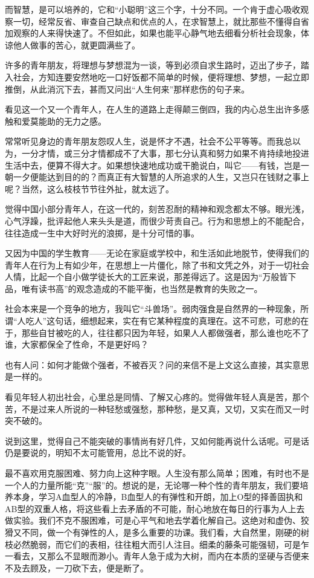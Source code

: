 \par 而智慧，是可以培养的，它和“小聪明”这三个字，十分不同。一个肯于虚心吸收观察一切，经常反省、审查自己缺点和优点的人，在求智慧上，就比那些不懂得自省加观察的人来得快速了。不但如此，如果也能平心静气地去细看分析社会现象，体谅他人做事的苦心，就更圆满些了。
\par 许多的青年朋友，将理想与梦想混为一谈，等到必须自求生路时，迈出了步子，踏入社会，方知连要安然地吃一口好饭都不简单的时候，便将理想、梦想，一起立即推倒，从此消沉下去，甚而又问出“人生何来”那样悲伤的句子来。
\par 看见这一个又一个青年人，在人生的道路上走得颠三倒四，我的内心总生出许多感触和爱莫能助的无力之感。
\par 常常听见身边的青年朋友怨叹人生，说是怀才不遇，社会不公平等等。而我总以为，一分才情，或三分才情都成不了大事，那七分认真和努力如果不肯持续地投进生活中去，便算不得大才。如果想快速地成功或干脆说白，叫它——有钱，岂是一朝一夕便能达到目的的？而真正有大智慧的人所追求的人生，又岂只在钱财之事上呢？当然，这么枝枝节节往外扯，就太远了。
\par 觉得中国小部分青年人，在这一代的，刻苦忍耐的精神和观念都太不够。眼光浅，心气浮躁，批评起他人来头头是道，而很少苛责自己。行为和思想上的不能配合，往往造成一生中大好时光的浪掷，是十分可惜的事。
\par 又因为中国的学生教育——无论在家庭或学校中，和生活如此地脱节，使得我们的青年人在行为上有如少年，在思想上一片僵化，除了书和文凭之外，对于一切社会人情，比起一个自小做学徒长大的工匠来说，那差得远了。这是因为“万般皆下品，唯有读书高”的观念造成的不能平衡，也当然是教育的失败之一。
\par 社会本来是一个竞争的地方，我叫它“斗兽场”。弱肉强食是自然界的一种现象，所谓“人吃人”这句话，细想起来，实在有它某种程度的真理在。这不可悲，可悲的在于，那些自甘被吃的人，往往都只因为年轻，如果人人都做强者，那么谁也吃不了谁，大家都保全了性命，不是更好吗？
\par 也有人问：如何才能做个强者，不被吞灭？问的来信不是上文这么直接，其实意思是一样的。
\par 看见年轻人初出社会，心里总是同情、了解又心疼的。觉得做年轻人真是苦，那个苦，不是过来人所说的一种轻愁或强愁，那种愁，是又真，又切，又实在而又一时突不破的。
\par 说到这里，觉得自己不能突破的事情尚有好几件，又如何能再说什么话呢。可是话仍是要说的，明知不太可能管用，总比不说的好。
\par 最不喜欢用克服困难、努力向上这种字眼。人生没有那么简单；困难，有时也不是一个人的力量所能“克”“服”的。想说的是，无论哪一种个性的青年朋友，我们要培养本身，学习A血型人的冷静，B血型人的有弹性和开朗，加上O型的择善固执和AB型的双重人格，将这些看上去矛盾的不可能，耐心地放在每日的行事为人上去做实验。我们不克不服困难，可是心平气和地去学着化解自己。这绝对和虚伪、狡猾又不同，做一个有弹性的人，是多么重要的功课。我们看，大自然里，刚硬的树枝必然脆弱，而它们的表相，往往粗大而引人注目。细柔的藤条可能强韧，可是乍一看去，又那么不显眼而渺小。青年人急于成为大树，而内在本质的坚硬与否便来不及去顾及，一刀砍下去，便是断了。
